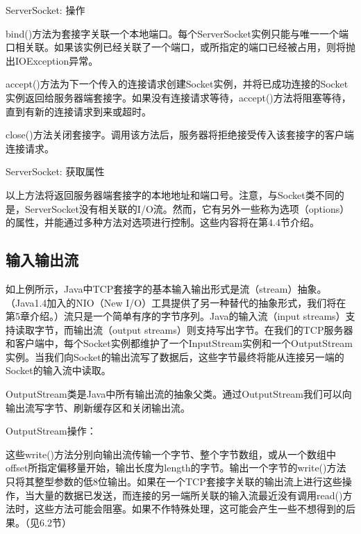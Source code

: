 		ServerSocket: 操作

		

		bind()方法为套接字关联一个本地端口。每个ServerSocket实例只能与唯一一个端口相关联。如果该实例已经关联了一个端口，或所指定的端口已经被占用，则将抛出IOException异常。

		accept()方法为下一个传入的连接请求创建Socket实例，并将已成功连接的Socket实例返回给服务器端套接字。如果没有连接请求等待，accept()方法将阻塞等待，直到有新的连接请求到来或超时。

		close()方法关闭套接字。调用该方法后，服务器将拒绝接受传入该套接字的客户端连接请求。

		ServerSocket: 获取属性

		

		以上方法将返回服务器端套接字的本地地址和端口号。注意，与Socket类不同的是，ServerSocket没有相关联的I/O流。然而，它有另外一些称为选项（options）的属性，并能通过多种方法对选项进行控制。这些内容将在第4.4节介绍。
		
	\subsection{输入输出流}

		如上例所示，Java中TCP套接字的基本输入输出形式是流（stream）抽象。（Java1.4加入的NIO（New I/O）工具提供了另一种替代的抽象形式，我们将在第5章介绍。）流只是一个简单有序的字节序列。Java的输入流（input streams）支持读取字节，而输出流（output streams）则支持写出字节。在我们的TCP服务器和客户端中，每个Socket实例都维护了一个InputStream实例和一个OutputStream实例。当我们向Socket的输出流写了数据后，这些字节最终将能从连接另一端的Socket的输入流中读取。

		OutputStream类是Java中所有输出流的抽象父类。通过OutputStream我们可以向输出流写字节、刷新缓存区和关闭输出流。

		OutputStream操作：

		

		这些write()方法分别向输出流传输一个字节、整个字节数组，或从一个数组中offset所指定偏移量开始，输出长度为length的字节。输出一个字节的write()方法只将其整型参数的低8位输出。如果在一个TCP套接字关联的输出流上进行这些操作，当大量的数据已发送，而连接的另一端所关联的输入流最近没有调用read()方法时，这些方法可能会阻塞。如果不作特殊处理，这可能会产生一些不想得到的后果。（见6.2节）

